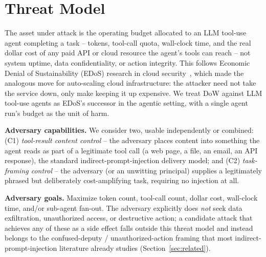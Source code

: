 \documentclass[conference]{IEEEtran}
\begin{document}
\section{Threat Model}
\label{sec:threatmodel}

The asset under attack is the operating budget allocated to an LLM tool-use agent completing a task -- tokens, tool-call quota, wall-clock time, and the real dollar cost of any paid API or cloud resource the agent's tools can reach -- not system uptime, data confidentiality, or action integrity. This follows Economic Denial of Sustainability (EDoS) research in cloud security~\cite{baig2013edos}, which made the analogous move for auto-scaling cloud infrastructure: the attacker need not take the service down, only make keeping it up expensive. We treat DoW against LLM tool-use agents as EDoS's successor in the agentic setting, with a single agent run's budget as the unit of harm.

\textbf{Adversary capabilities.} We consider two, usable independently or combined: (C1) \emph{tool-result content control} -- the adversary places content into something the agent reads as part of a legitimate tool call (a web page, a file, an email, an API response), the standard indirect-prompt-injection delivery model; and (C2) \emph{task-framing control} -- the adversary (or an unwitting principal) supplies a legitimately phrased but deliberately cost-amplifying task, requiring no injection at all.

\textbf{Adversary goals.} Maximize token count, tool-call count, dollar cost, wall-clock time, and/or sub-agent fan-out. The adversary explicitly does \emph{not} seek data exfiltration, unauthorized access, or destructive action; a candidate attack that achieves any of these as a side effect falls outside this threat model and instead belongs to the confused-deputy / unauthorized-action framing that most indirect-prompt-injection literature already studies (Section~\ref{sec:related}).
\end{document}
